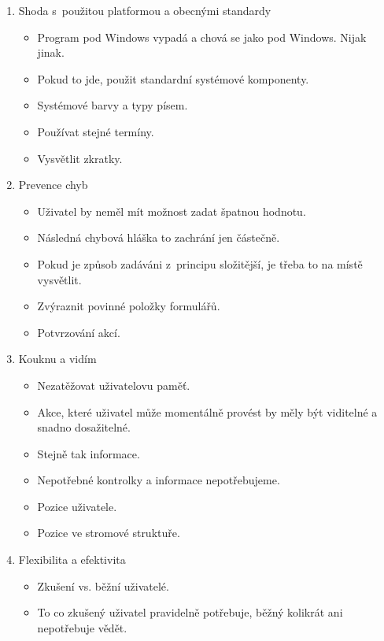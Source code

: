 \begin{enumerate}
\begin{itemize}
        \end{itemize}
    \item Shoda s~použitou platformou a obecnými standardy
        \begin{itemize}
            \item Program pod Windows vypadá a chová se jako pod Windows. Nijak jinak.
            \item Pokud to jde, použit standardní systémové komponenty.
            \item Systémové barvy a typy písem.
            \item Používat stejné termíny.
            \item Vysvětlit zkratky.
        \end{itemize}
    \item Prevence chyb
        \begin{itemize}
            \item Uživatel by neměl mít možnost zadat špatnou hodnotu.
            \item Následná chybová hláška to zachrání jen částečně.
            \item Pokud je způsob zadáváni z~principu složitější, je třeba to na místě vysvětlit.
            \item Zvýraznit povinné položky formulářů.
            \item Potvrzování akcí.
        \end{itemize}
    \item Kouknu a vidím
        \begin{itemize}
            \item Nezatěžovat uživatelovu paměť.
            \item Akce, které uživatel může momentálně provést by měly být viditelné a snadno dosažitelné.
            \item Stejně tak informace.
            \item Nepotřebné kontrolky a informace nepotřebujeme.
            \item Pozice uživatele.
            \item Pozice ve stromové struktuře.
        \end{itemize}
    \item Flexibilita a efektivita
        \begin{itemize}
            \item Zkušení vs. běžní uživatelé.
            \item To co zkušený uživatel pravidelně potřebuje, běžný kolikrát ani nepotřebuje vědět.

\end{itemize}
\end{enumerate}
